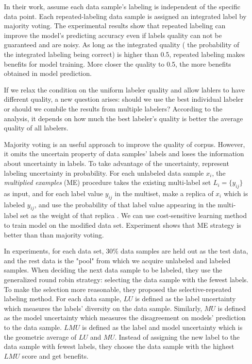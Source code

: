 \documentclass[11pt]{article}
\begin{document}
In their work,  assume each data sample's labeling is independent of the specific data point. Each repeated-labeling data sample is assigned an integrated label by majority voting. The experimental results show that repeated labeling can improve the model's predicting accuracy even if labels quality can not be guaranteed and are noisy.  As long as the integrated quality ( the probability of the integrated labeling being correct) is higher than 0.5, repeated labeling makes benefits for model training. More closer the quality to 0.5, the more benefits obtained in model prediction.

If we relax the condition on the uniform labeler quality and allow lablers to have different quality,  a new question arises: should we use the best individual labeler or should we combile the results from multiple labelers? According to the analysis,  it depends on how much the best labeler's quality is better the average quality of all labelers.

Majority voting is an useful approach to improve the quality of corpus. However, it omits  the uncertain property of data samples' labels and loses the information about uncertainty in labels. To take advantage of the uncertainty,  represent labeling uncertainty in probability. For each unlabeled data sample $x_{i}$, the \textit{multiplied examples} (ME) procedure takes the existing multi-label set  $L_i = \{y_{ij}\}$ as input, and for each label value $y_{ij} $ in the multiset, make a replica of $x_i$ which is labeled $y_{ij}$, and use the probability of that label value appearing in the multi-label set as the weight of that replica . We can use cost-sensitive learning method to train model on the modified data set. Experiment shows that ME strategy is better than than majority voting.

In experiments, for each data set, 30\% data samples are held out as the test data, and the rest data is the "pool" from which we acquire unlabeled and labeled samples. When deciding the next data sample to be labeled, they use the generalized round robin strategy: selecting the data sample with the fewest labels. To make the selection more reasonable, they proposed the selective-repeated labeling method. For each data sample, $LU$ is defined as the label uncertainty which measures the labels' diversity on the data sample. Similarly, $MU$ is defined as the model uncertainty which measures the disagreement on models' prediction to the data sample. $LMU$ is defined as the label and model uncertainty which is the geometric average of $LU$ and $MU$. Instead of assigning the new label to  the data sample with fewest labels, they choose the data sample with the highest $LMU$ score and get benefits.
\end{document}
